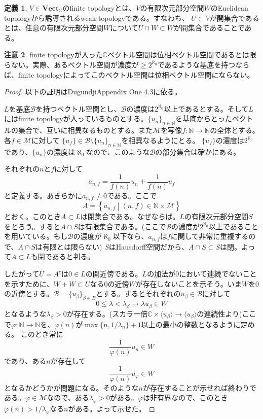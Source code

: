 ﻿\documentclass[12pt]{jsarticle}
\newcommand{\N}{\mathbb{N}}
\newcommand{\C}{\mathbb{C}}
\newcommand{\Vect}{\textbf{Vect}_{\C}}
\newcommand{\setmid}[2]{\left\{ #1 \mathrel{} \middle| \mathrel{} #2 \right\}}%
\theoremstyle{definition}%
\newtheorem{definition}{定義}[section]%
\newtheorem{remark}[definition]{注意}
\renewenvironment{leftbar}{%
  \renewcommand\FrameCommand{\vrule width 1pt \hspace{10pt}}%
  \MakeFramed {\advance\hsize-\width \FrameRestore}}
 {\endMakeFramed}
\newenvironment{bardefinition}{ \begin{definition} \begin{leftbar}} {\end{leftbar} \end{definition}}
\begin{document}
\begin{bardefinition}
  $V \in \Vect$のfinite topologyとは、$V$の有限次元部分空間$W$のEuclidean topologyから誘導されるweak topologyである。すなわち、
  $U \subset V$が開集合であるとは、任意の有限次元部分空間$W$について$U \cap W \subset W$が開集合であることである。
\end{bardefinition}

\begin{remark}\label{counterex}
finite topologyが入った$\C$ベクトル空間は位相ベクトル空間であるとは限らない。実際、あるベクトル空間が濃度が$\geq 2^{\aleph_0}$であるような基底を持つならば、finite topologyによってこのベクトル空間は位相ベクトル空間にならない。
\end{remark}
\begin{proof}
  以下の証明はDugundji\cite{Dugundji}Appendix One 4.3に依る。

$L$を基底$\mathscr{B}$を持つベクトル空間とし、$\mathscr{B}$の濃度は$2^{\aleph_0}$以上であるとする。そして$L$にはfinite topologyが入っているものとする。$\{u_n \}_{n \in \N}$を基底からとったベクトルの集合で、互いに相異なるものとする。また$\mathscr{M}$を写像$f \colon \N \to \N$の全体とする。各$f \in \mathscr{M}$に対して
$\{ u_f \} \in \mathscr{B}  \setminus \{ u_n \}_{n \in \N}$を相異なるようにとる。
$\{ u_f \}$の濃度は$2^{\aleph_0}$であり、$\{u_n\}$の濃度は$\aleph_0$なので、このような$\mathscr{B}$の部分集合は確かにある。

  それぞれの$n$と$f$に対して
  \[
  a_{n,f}= \frac{1}{f(n)} u_n + \frac{1}{f(n)} u_f
  \]
  と定義する。あきらかに$a_{n,f} \neq 0$である。ここで
  \[
  A = \setmid{a_{n,f}}{(n,f) \in \N \times \mathscr{M}}
  \]
  とおく。このとき$A \subset L$は閉集合である。なぜならば。$L$の有限次元部分空間$S$をとろう。すると$A \cap S$は有限集合である。(ここで$\mathscr{B}$の濃度が$2^{\aleph_0}$以上であることを用いている。もし$\mathscr{B}$の濃度が$\aleph_0$以下なら、$a_{n,f}$は$f$に関して非常に重複するので、$A \cap S$は有限とは限らない) $S$はHausdorff空間だから、$A \cap S \subset S$は閉。よって$A \subset L$も閉であると判る。

  したがって$U = A^c$は$0 \in L$の開近傍である。$L$の加法が$0$において連続でないことを示すために、$W + W \subset U$なる$0$の近傍$W$が存在しないことを示そう。いま$W$を$0$の近傍とする。$\mathscr{B}=\{ u_{\beta}\}_{\beta \in B}$とする。するとそれぞれの$u_{\beta} \in \mathscr{B}$に対して
  \[
  0 \leq \lambda < \lambda_{\beta} \to \lambda u_{\beta} \in W
  \]
となるような$\lambda_{\beta} > 0$が存在する。(スカラー倍$\C \times \langle u_{\beta} \rangle \to \langle u_{\beta} \rangle$の連続性より)ここで$\varphi \colon \N \to \N$を、$\varphi(n)$が$ \max\{ n, 1/ \lambda_{n} \} + 1 $以上の最小の整数となるように定める。
このとき常に
\[
\frac{1}{\varphi(n)}u_n \in W
\]
であり、ある$n$が存在して
\[
\frac{1}{\varphi(n)}u_{\varphi} \in W
\]
となるかどうかが問題になる。そのような$n$が存在することが示せれば終わりである。$\varphi \in \mathscr{M}$なので、ある$\lambda_{\varphi} > 0$がある。$\varphi$は非有界なので、このとき$\varphi(\overline{n}) > 1/ \lambda_{\varphi}$なる$\overline{n}$がある。よって示せた。
\end{proof}
\end{document}
